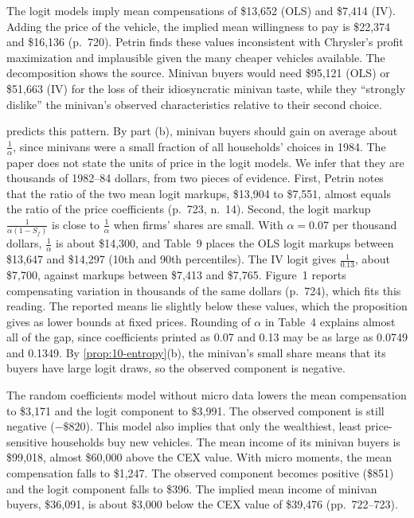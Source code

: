 The logit models imply mean compensations of \$13,652 (OLS) and \$7,414 (IV). Adding the price of the vehicle, the
implied mean willingness to pay is \$22,374 and \$16,136 (p.~720). Petrin finds these values inconsistent with
Chrysler's profit maximization and implausible given the many cheaper vehicles available. The decomposition shows the
source. Minivan buyers would need \$95,121 (OLS) or \$51,663 (IV) for the loss of their idiosyncratic minivan taste,
while they ``strongly dislike'' the minivan's observed characteristics relative to their second choice.

 predicts this pattern. By part (b), minivan buyers should gain on average about
$\frac{1}{\alpha}$, since minivans were a small fraction of all households' choices in 1984. The paper does not state
the units of price in the logit models. We infer that they are thousands of 1982--84 dollars, from two pieces of
evidence. First, Petrin notes that the ratio of the two mean logit markups, \$13,904 to \$7,551, almost equals the
ratio of the price coefficients (p.~723, n.~14). Second, the logit markup $\frac{1}{\alpha(1 - S_f)}$ is close to
$\frac{1}{\alpha}$ when firms' shares are small. With $\alpha = 0.07$ per thousand dollars, $\frac{1}{\alpha}$ is about
\$14,300, and Table~9 places the OLS logit markups between \$13,647 and \$14,297 (10th and 90th percentiles). The IV
logit gives $\frac{1}{0.13}$, about \$7,700, against markups between \$7,413 and \$7,765. Figure~1 reports compensating
variation in thousands of the same dollars (p.~724), which fits this reading.
The reported means lie slightly below these values, which the proposition gives as lower bounds at fixed prices.
Rounding of $\alpha$ in Table~4 explains almost all of the gap, since coefficients printed as 0.07 and 0.13 may be as
large as 0.0749 and 0.1349.
By \cref{prop:10-entropy}(b), the minivan's small share means that its
buyers have large logit draws, so the observed component is negative.

The random coefficients model without micro data lowers the mean compensation to \$3,171 and the logit component to
\$3,991. The observed component is still negative ($-\$820$). This model also implies that only the wealthiest, least
price-sensitive households buy new vehicles. The mean income of its minivan buyers is \$99,018, almost \$60,000 above
the CEX value. With micro moments, the mean compensation falls to \$1,247. The observed component becomes positive
(\$851) and the logit component falls to \$396. The implied mean income of minivan buyers, \$36,091, is about \$3,000
below the CEX value of \$39,476 (pp.~722--723).

